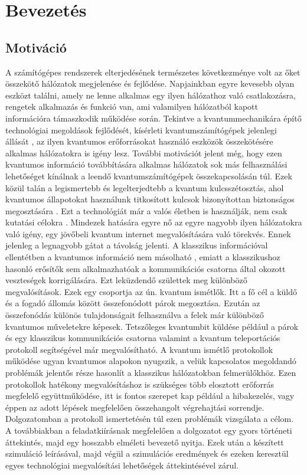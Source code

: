 \chapter{Bevezetés}

\section{Motiváció}

A számítógépes rendszerek elterjedésének természetes következménye volt az őket összekötő hálózatok megjelenése és fejlődése. Napjainkban egyre kevesebb olyan eszközt találni, amely ne lenne alkalmas egy ilyen hálózathoz való csatlakozásra, rengetek alkalmazás és funkció van, ami valamilyen hálózatból kapott információra támaszkodik működése során. Tekintve a kvantummechanikára építő technológiai megoldások fejlődését, kísérleti kvantumszámítógépek jelenlegi állását \cite{IBMQC}\cite{neill2017blueprint} , az ilyen kvantumos erőforrásokat használó eszközök összekötésére alkalmas hálózatokra is igény lesz. További motivációt jelent még, hogy ezen kvantumos információ továbbítására alkalmas hálózatok sok más felhasználási lehetőséget kínálnak a leendő kvantumszámítógépek összekapcsolásán túl. Ezek közül talán a legismertebb és legelterjedtebb a kvantum kulcsszétosztás, ahol kvantumos állapotokat használunk titkosított kulcsok bizonyítottan biztonságos megosztására \cite{BB84}. Ezt a technológiát már a valós életben is használják, nem csak kutatási célokra \cite{Swisselection}. Mindezek hatására egyre nő az egyre nagyobb ilyen hálózatokra való igény, egy jövőbeli kvantum internet \cite{kimble2008quantum} megvalósítására való törekvés. Ennek jelenleg a legnagyobb gátat a távolság jelenti. A klasszikus információval ellentétben a kvantumos információ nem másolható \cite{wootters1982single}, emiatt a klasszikushoz hasonló erősítők sem alkalmazhatóak a kommunikációs csatorna által okozott veszteségek korrigálására. Ezt leküzdendő születtek meg különböző megvalósítások. Ezek egy csoportja az ún. kvantum ismétlők. Itt a fő cél a küldő és a fogadó állomás között összefonódott párok megosztása. Ezután az összefonódás különös tulajdonságait felhasználva a felek már különböző kvantumos műveletekre képesek. Tetszőleges kvantumbit küldése például a párok és egy klasszikus kommunikációs csatorna valamint a kvantum teleportációs protokoll \cite{bennett1993teleporting} segítségével már megvalósítható. A kvantum ismétlő protokollok működése ugyan kvantumos alapokon nyugszik, a velük kapcsolatos megoldandó problémák jelentős része hasonlít a klasszikus hálózatokban felmerülőkhöz. Ezen protokollok hatékony megvalósításhoz is szükséges több elosztott erőforrás megfelelő együttműködése, itt is fontos szerepet kap például a hibakezelés, vagy éppen az adott lépések megfelelően összehangolt végrehajtási sorrendje. Dolgozatomban a protokoll ismertetésén túl ezen problémák vizsgálata a célom.\\
A továbbiakban a feladatkiírásnak megfelelően a dolgozatot egy gyors történeti áttekintés, majd egy hosszabb elméleti bevezető nyitja. Ezek után a készített szimuláció leírásával, majd végül a szimulációs eredmények és ezeken keresztül egyes technológiai megvalósítási lehetőségek áttekintésével zárul.



